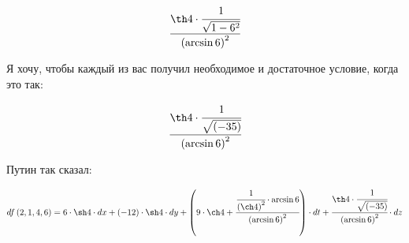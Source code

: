 \begin{dmath}
\cfrac{\th 4 \cdot \cfrac{1}{\sqrt{  1 - 6^{2}}}}{\left(\arcsin 6\right)^{2}}
\end{dmath}


Я хочу, чтобы каждый из вас получил необходимое и достаточное условие, когда это так:


\begin{dmath}
\cfrac{\th 4 \cdot \cfrac{1}{\sqrt{  (-35)}}}{\left(\arcsin 6\right)^{2}}
\end{dmath}


Путин так сказал:


\begin{dmath}
d f \left(  2,  1,  4,  6 \right) = 6 \cdot \sh 4 \cdot d x  + (-12) \cdot \sh 4 \cdot d y  +  \left( 9 \cdot \ch 4 + \cfrac{\cfrac{1}{\left(\ch 4\right)^{2}} \cdot \arcsin 6}{\left(\arcsin 6\right)^{2}} \right)  \cdot d t  + \cfrac{\th 4 \cdot \cfrac{1}{\sqrt{  (-35)}}}{\left(\arcsin 6\right)^{2}} \cdot d z 
\end{dmath}




